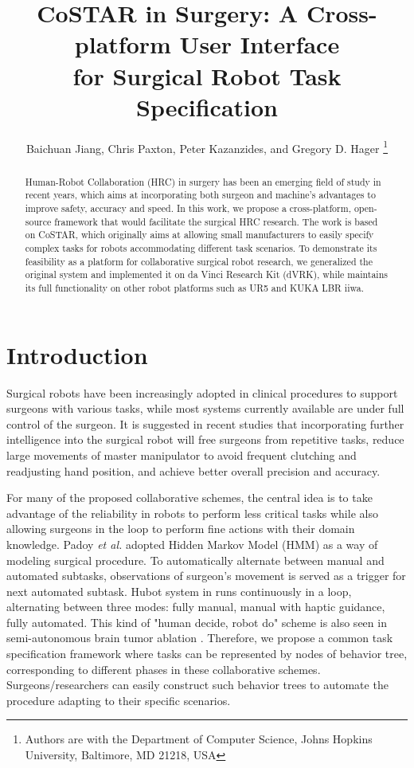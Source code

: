 \documentclass[letterpaper, 10 pt, conference]{ieeeconf}
\title{\huge \bf
CoSTAR in Surgery: A Cross-platform User Interface \\for Surgical Robot Task Specification
}
\author{Baichuan Jiang, Chris Paxton, Peter Kazanzides, and Gregory D. Hager
\thanks{Authors are with the Department of Computer Science, Johns Hopkins University,
        Baltimore, MD 21218, USA}
}
\begin{document}
\maketitle
\thispagestyle{empty}
\pagestyle{empty}


\begin{abstract}

Human-Robot Collaboration (HRC) in surgery has been an emerging field of study in recent years, which aims at incorporating both surgeon and machine's advantages to improve safety, accuracy and speed. In this work, we propose a cross-platform, open-source framework that would facilitate the surgical HRC research. The work is based on CoSTAR, which originally aims at allowing small manufacturers to easily specify complex tasks for robots accommodating different task scenarios. To demonstrate its feasibility as a platform for collaborative surgical robot research, we generalized the original system and implemented it on da Vinci Research Kit (dVRK), while maintains its full functionality on other robot platforms such as UR5 and KUKA LBR iiwa.  

\end{abstract}


\section{Introduction}

Surgical robots have been increasingly adopted in clinical procedures to support surgeons with various tasks, while most systems currently available are under full control of the surgeon. It is suggested in recent studies \cite{padoy2011human,berthet2016hubot,bauzano2016collaborative,hu2015semi} that incorporating further intelligence into the surgical robot will free surgeons from repetitive tasks, reduce large movements of master manipulator to avoid frequent clutching and readjusting hand position, and achieve better overall precision and accuracy. 

For many of the proposed collaborative schemes, the central idea is to take advantage of the reliability in robots to perform less critical tasks while also allowing surgeons in the loop to perform fine actions with their domain knowledge. Padoy \textit{et al.} \cite{padoy2011human} adopted Hidden Markov Model (HMM) as a way of modeling surgical procedure. To automatically alternate between manual and automated subtasks, observations of surgeon’s movement is served as a trigger for next automated subtask. Hubot system in \cite{berthet2016hubot} runs continuously in a loop, alternating between three modes: fully manual, manual with haptic guidance, fully automated. This kind of "human decide, robot do" scheme is also seen in semi-autonomous brain tumor ablation \cite{hu2015semi}.  Therefore, we propose a common task specification framework where tasks can be represented by nodes of behavior tree, corresponding to different phases in these collaborative schemes. Surgeons/researchers can easily construct such  behavior trees to automate the procedure adapting to their specific scenarios. 
\end{document}

